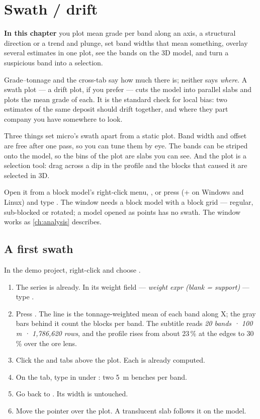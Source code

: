 \chapter{Swath / drift}\label{ch:swath}
\begin{goals}
\textbf{In this chapter} you plot mean grade per band along an axis, a structural direction or a trend and plunge, set band widths that mean something, overlay several estimates in one plot, see the bands on the 3D model, and turn a suspicious band into a selection.
\end{goals}

Grade–tonnage and the cross-tab say how much there is; neither says \emph{where}. A swath plot — a drift plot, if you prefer — cuts the model into parallel slabs and plots the mean grade of each. It is the standard check for local bias: two estimates of the same deposit should drift together, and where they part company you have somewhere to look.

Three things set micro's swath apart from a static plot. Band width and offset are free after one pass, so you can tune them by eye. The bands can be striped onto the model, so the bins of the plot are slabs you can see. And the plot is a selection tool: drag across a dip in the profile and the blocks that caused it are selected in 3D.

Open it from a block model's right-click menu, , or press  (+ on Windows and Linux) and type . The window needs a block model with a block grid — regular, sub-blocked or rotated; a model opened as points has no swath. The window works as \cref{ch:analysis} describes.

\section{A first swath}\label{sec:swath-first}
\begin{tryit}
In the demo project, right-click  and choose .
\begin{enumerate}
\item The series is  already. In its weight field — \emph{weight expr (blank = support)} — type .
\item Press . The line is the tonnage-weighted mean  of each band along X; the gray bars behind it count the blocks per band. The subtitle reads \emph{20 bands · 100 m · 1,786,620 rows}, and the profile rises from about 23\,\% at the edges to 30\,\% over the ore lens.
\item Click the  and  tabs above the plot. Each is already computed.
\item On the  tab, type  in  under : two 5~m benches per band.
\item Go back to . Its width is untouched.
\item Move the pointer over the plot. A translucent slab follows it on the model.
\end{enumerate}
\end{tryit}

